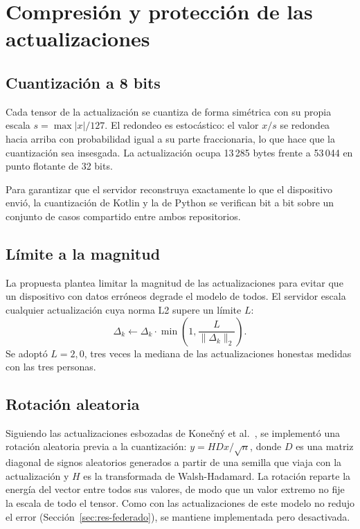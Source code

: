 \section{Compresión y protección de las actualizaciones}

\subsection{Cuantización a 8 bits}

Cada tensor de la actualización se cuantiza de forma simétrica con su propia escala $s = \max|x| / 127$. El redondeo es estocástico: el valor $x/s$ se redondea hacia arriba con probabilidad igual a su parte fraccionaria, lo que hace que la cuantización sea insesgada. La actualización ocupa 13\,285 bytes frente a 53\,044 en punto flotante de 32 bits.

Para garantizar que el servidor reconstruya exactamente lo que el dispositivo envió, la cuantización de Kotlin y la de Python se verifican bit a bit sobre un conjunto de casos compartido entre ambos repositorios.

\subsection{Límite a la magnitud}

La propuesta plantea limitar la magnitud de las actualizaciones para evitar que un dispositivo con datos erróneos degrade el modelo de todos. El servidor escala cualquier actualización cuya norma L2 supere un límite $L$:
\begin{equation}
    \Delta_k \leftarrow \Delta_k \cdot \min\left(1, \frac{L}{\lVert \Delta_k \rVert_2}\right).
\end{equation}
Se adoptó $L = 2{,}0$, tres veces la mediana de las actualizaciones honestas medidas con las tres personas.

\subsection{Rotación aleatoria}

Siguiendo las actualizaciones esbozadas de Kone\v{c}n\'y et al.~\cite{konecny2016}, se implementó una rotación aleatoria previa a la cuantización: $y = H D x / \sqrt{n}$, donde $D$ es una matriz diagonal de signos aleatorios generados a partir de una semilla que viaja con la actualización y $H$ es la transformada de Walsh-Hadamard. La rotación reparte la energía del vector entre todos sus valores, de modo que un valor extremo no fije la escala de todo el tensor. Como con las actualizaciones de este modelo no redujo el error (Sección~\ref{sec:res-federado}), se mantiene implementada pero desactivada.

